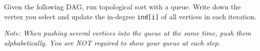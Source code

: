 
Given the following DAG, run topological sort with a queue. Write down the vertex you select and update the in-degree \texttt{ind[i]} of all vertices in each iteration.

\textit{Note: When pushing several vertices into the queue at the same time, push them alphabetically. You are NOT required to show your queue at each step.}

\vspace{1cm}

\begin{figure}[htbp]
    \centering
    \label{fig:Topological_Sort}
\end{figure}
\vspace{0.5cm}

